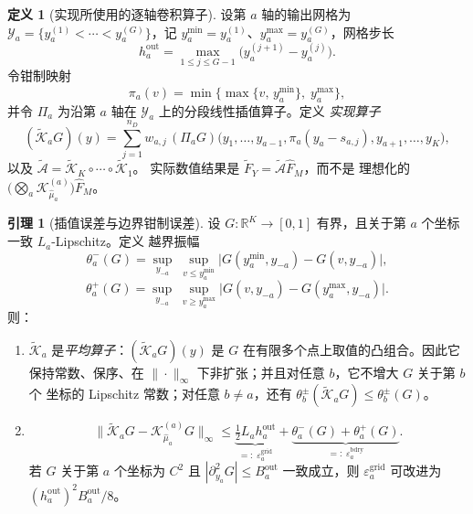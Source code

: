 \documentclass[a4paper,11pt]{article}
\theoremstyle{definition}
\newtheorem{lemma}{引理}
\newtheorem{definition}{定义}
\newcommand{\R}{\mathbb R}
\newcommand{\1}{\mathbf 1}
\begin{document}
\begin{definition}[实现所使用的逐轴卷积算子]
\label{def:implop}
设第 $a$ 轴的输出网格为
$\mathcal Y_a=\{y_a^{(1)}<\cdots<y_a^{(G)}\}$，记
$y_a^{\min}=y_a^{(1)}$、$y_a^{\max}=y_a^{(G)}$，网格步长
\[
h_a^{\mathrm{out}}=\max_{1\le j\le G-1}\bigl(y_a^{(j+1)}-y_a^{(j)}\bigr).
\]
令钳制映射
\[
\pi_a(v)=\min\bigl\{\max\{v,\,y_a^{\min}\},\;y_a^{\max}\bigr\},
\]
并令 $\Pi_a$ 为沿第 $a$ 轴在 $\mathcal Y_a$ 上的分段线性插值算子。定义
\emph{实现算子}
\[
(\widetilde{\mathcal K}_aG)(y)
=
\sum_{j=1}^{n_D}w_{a,j}\,
(\Pi_aG)\bigl(y_1,\ldots,y_{a-1},\pi_a(y_a-s_{a,j}),y_{a+1},\ldots,y_K\bigr),
\]
以及
$\widetilde{\mathcal A}
=\widetilde{\mathcal K}_K\circ\cdots\circ\widetilde{\mathcal K}_1$。
实际数值结果是 $\widetilde F_Y=\widetilde{\mathcal A}\widehat F_M$，而不是
理想化的 $\bigl(\bigotimes_a\mathcal K_{\widehat\mu_a}^{(a)}\bigr)
\widehat F_M$。
\end{definition}

\begin{lemma}[插值误差与边界钳制误差]
\label{lem:gridbd}
设 $G:\R^K\to[0,1]$ 有界，且关于第 $a$ 个坐标一致 $L_a$-Lipschitz。定义
越界振幅
\[
\theta_a^-(G)
=
\sup_{y_{-a}}\;\sup_{v\le y_a^{\min}}
\bigl|G(y_a^{\min},y_{-a})-G(v,y_{-a})\bigr|,
\]
\[
\theta_a^+(G)
=
\sup_{y_{-a}}\;\sup_{v\ge y_a^{\max}}
\bigl|G(v,y_{-a})-G(y_a^{\max},y_{-a})\bigr| .
\]
则：
\begin{enumerate}[label=(\roman*)]
\item $\widetilde{\mathcal K}_a$ 是\emph{平均算子}：$(\widetilde{\mathcal
K}_aG)(y)$ 是 $G$ 在有限多个点上取值的凸组合。因此它保持常数、保序、在
$\|\cdot\|_\infty$ 下非扩张；并且对任意 $b$，它不增大 $G$ 关于第 $b$ 个
坐标的 Lipschitz 常数；对任意 $b\ne a$，还有
$\theta_b^{\pm}(\widetilde{\mathcal K}_aG)\le\theta_b^{\pm}(G)$。
\item
\[
\bigl\|\widetilde{\mathcal K}_aG-\mathcal K_{\widehat\mu_a}^{(a)}G\bigr\|_\infty
\le
\underbrace{\tfrac12L_ah_a^{\mathrm{out}}}
_{=:\;\varepsilon_a^{\mathrm{grid}}}
+
\underbrace{\theta_a^-(G)+\theta_a^+(G)}
_{=:\;\varepsilon_a^{\mathrm{bdry}}} .
\]
若 $G$ 关于第 $a$ 个坐标为 $C^2$ 且 $|\partial_{y_a}^2G|\le B_a^{\mathrm{out}}$
一致成立，则 $\varepsilon_a^{\mathrm{grid}}$ 可改进为
$(h_a^{\mathrm{out}})^2B_a^{\mathrm{out}}/8$。
\end{enumerate}
\end{lemma}
\end{document}
